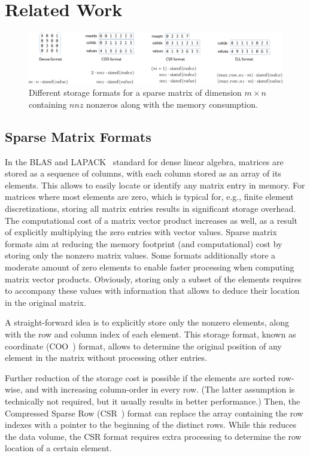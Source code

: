 \section{Related Work}
\label{2017-coo-spmv:s2-related}

\begin{figure}
\centering
\includegraphics[width=\textwidth]{plots/formats}
\caption{Different storage formats for a sparse matrix of dimension $m\times n$ containing $nnz$ nonzeros along with the memory consumption.}
\label{2017-coo-spmv:fig:formatoverview}
\end{figure}

\subsection{Sparse Matrix Formats}
In the BLAS and LAPACK~\cite{lapack} standard for dense linear algebra, 
matrices are stored as a sequence of columns, with each column stored as an
array of its elements.
This allows to easily locate or identify any matrix entry in memory.
For matrices where most elements are zero, which is typical for, e.g., finite
element discretizations,
storing all matrix entries results in significant storage overhead.
The computational cost of a matrix vector product increases as well, as a result
of explicitly multiplying the zero entries with vector values.
Sparse matrix formats aim at reducing the memory footprint (and computational) 
cost by storing only the nonzero matrix values. Some formats additionally store
a moderate amount of zero elements to enable faster processing when computing
matrix vector products. Obviously, storing only a subset of the elements
requires to accompany these values with information that allows to deduce their
location in the original matrix.

A straight-forward idea is to explicitly store only the nonzero elements,
along with the row and column index of each element.
This storage format, known as coordinate (COO~\cite{barrettemplates}) format,
allows to determine the original position of any element
in the matrix without processing other entries.

Further reduction of the storage cost is possible if the elements are
sorted row-wise, and with increasing column-order in every row.
(The latter assumption is technically not required,
but it usually results in better performance.)
Then, the Compressed Sparse Row (CSR~\cite{barrettemplates}) format
can replace the array containing the row indexes with a pointer to the
beginning
of the distinct rows. While this reduces the data volume,
the CSR format requires extra processing to determine the row location of
a certain element.

